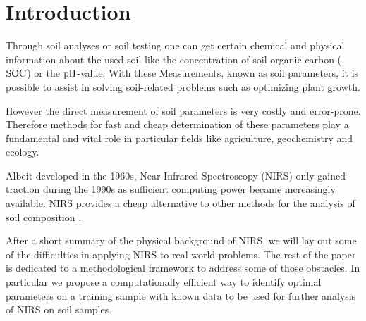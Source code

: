 \section{Introduction}
\label{sec:introduction}
	
	Through soil analyses or soil testing one can get certain chemical and physical information about the used soil like the concentration of soil organic carbon ($\mathrm{SOC}$) or the $\mathrm{pH}$-value.
	With these Measurements, known as soil parameters, it is possible to assist in solving soil-related problems such as optimizing plant growth.
	
	However the direct measurement of soil parameters is very costly and error-prone.
	Therefore methods for fast and cheap determination of these parameters play a fundamental and vital role in particular fields like agriculture, geochemistry and ecology.

	Albeit developed in the 1960s, Near Infrared Spectroscopy (NIRS) only gained traction during the 1990s as sufficient computing power became increasingly available.
	NIRS provides a cheap alternative to other methods for the analysis of soil composition %
	.

	After a short summary of the physical background of NIRS, we will lay out some of the difficulties in applying NIRS to real world problems.
	The rest of the paper is dedicated to a methodological framework to address some of those obstacles.
	In particular we propose a computationally efficient way to identify %
	optimal parameters on a training sample with known data to be used for further analysis of NIRS on soil samples.


